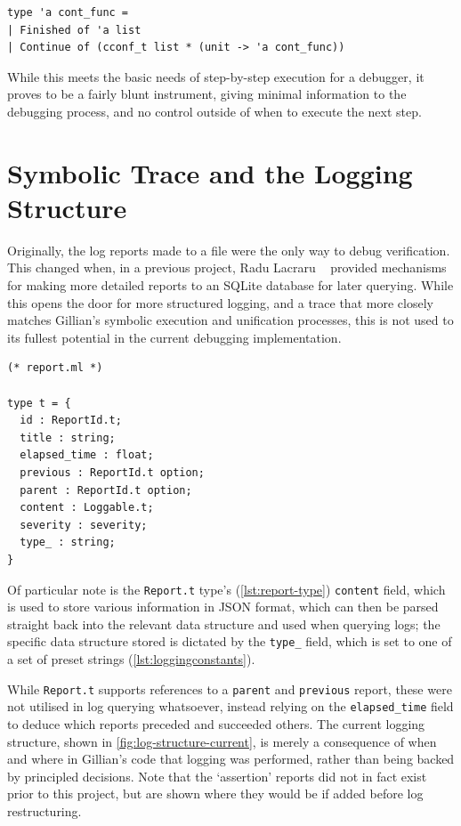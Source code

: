 \begin{lstlisting}[caption={
  The original \texttt{cont\_func} type
  \label{lst:contfunc-type-original}}, style=code, numbers=none]
type 'a cont_func =
| Finished of 'a list
| Continue of (cconf_t list * (unit -> 'a cont_func))
\end{lstlisting}

While this meets the basic needs of step-by-step execution for a debugger, it
proves to be a fairly blunt instrument, giving minimal information to the
debugging process, and no control outside of when to execute the next step.


\section{Symbolic Trace and the Logging Structure}\label{sec:current:trace}

Originally, the log reports made to a file were the only way to debug
verification. This changed when, in a previous project, Radu Lacraru
~\cite{gillian-logging-2020} provided mechanisms for making more detailed
reports to an SQLite database for later querying. While this opens the door for
more structured logging, and a trace that more closely matches Gillian's
symbolic execution and unification processes, this is not used to its fullest
potential in the current debugging implementation.

\begin{lstlisting}[caption={
  The \texttt{Report.t} type
  \label{lst:report-type}}, style=code, numbers=none]
(* report.ml *)

type t = {
  id : ReportId.t;
  title : string;
  elapsed_time : float;
  previous : ReportId.t option;
  parent : ReportId.t option;
  content : Loggable.t;
  severity : severity;
  type_ : string;
}
\end{lstlisting}

Of particular note is the \texttt{Report.t} type's (\autoref{lst:report-type})
\texttt{content} field, which is used to store various information in JSON
format, which can then be parsed straight back into the relevant data structure
and used when querying logs; the specific data structure stored is dictated by
the \texttt{type\_} field, which is set to one of a set of preset strings
(\autoref{lst:loggingconstants}).

While \texttt{Report.t} supports references to a \texttt{parent} and
\texttt{previous} report, these were not utilised in log querying whatsoever,
instead relying on the \texttt{elapsed\_time} field to deduce which reports
preceded and succeeded others. The current logging structure, shown in
\autoref{fig:log-structure-current}, is merely a consequence of when and where
in Gillian's code that logging was performed, rather than being backed by
principled decisions. Note that the `assertion' reports did not in fact exist
prior to this project, but are shown where they would be if added before log
restructuring.

